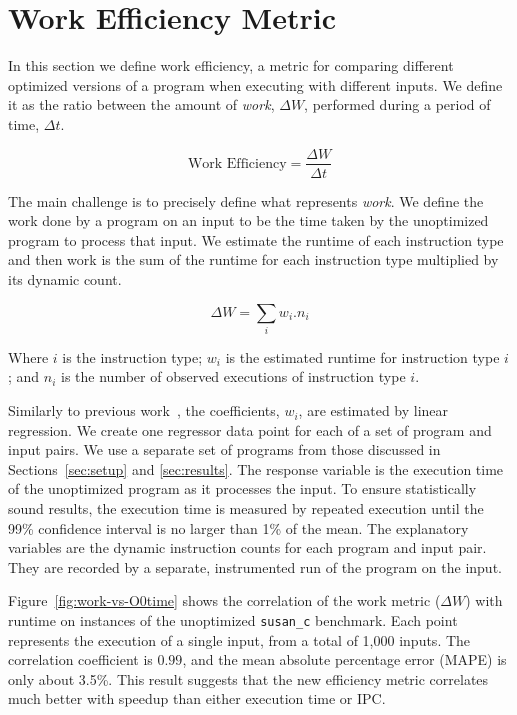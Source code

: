 \section{Work Efficiency Metric} \label{sec:metric}

    In this section we define work efficiency, a metric for comparing different optimized versions of a program when executing with
    different inputs. We define it as the ratio between the amount of \textit{work}, $\Delta W$, performed during a period of time, $\Delta
    t$.

    \[
       \textrm{Work Efficiency} = \frac{\Delta W}{\Delta t}
    \]

    The main challenge is to precisely define what represents \textit{work}. We define the work done by a program on an input to be the
    time taken by the unoptimized program to process that input. We estimate the runtime of each instruction type and then work is the sum
    of the runtime for each instruction type multiplied by its dynamic count.

    \[ \Delta W = \sum_i w_i.n_i \]

    Where $i$ is the instruction type; $w_i$ is the estimated runtime for instruction type $i$; and $n_i$ is the number of observed
    executions of instruction type $i$.

    Similarly to previous work~\citep{giusto01,powell09,brandolese11}, the coefficients, $w_i$, are estimated by linear regression. We
    create one regressor data point for each of a set of program and input pairs. We use a separate set of programs from those discussed in
    Sections~\ref{sec:setup} and \ref{sec:results}.
    The response variable is the execution time of the unoptimized program as it processes the input. To ensure statistically sound
    results, the execution time is measured by repeated execution until the 99\% confidence interval is no larger than 1\% of the mean. The
    explanatory variables are the dynamic instruction counts for each program and input pair. They are recorded by a separate, instrumented
    run of the program on the input.

    Figure~\ref{fig:work-vs-O0time} shows the correlation of the work metric ($\Delta W$) with runtime on instances of the unoptimized
    \texttt{susan\_c} benchmark. Each point represents the execution of a single input, from a total of 1,000 inputs. The correlation
    coefficient is $0.99$, and the mean absolute percentage error (MAPE) is only about 3.5\%. This result suggests that the new efficiency
    metric correlates much better with speedup than either execution time or IPC.

